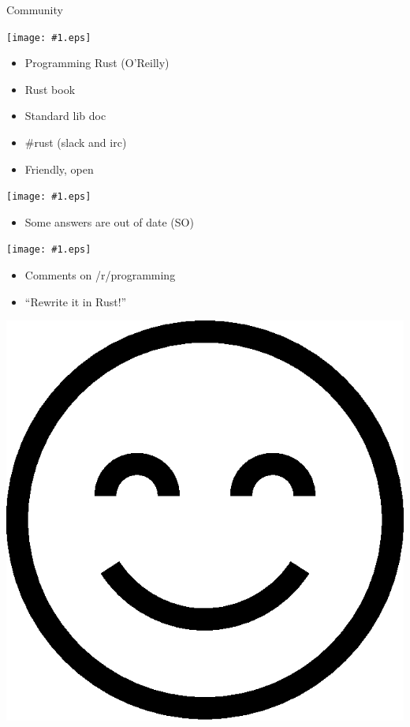 \documentclass{beamer}
\renewcommand\big[1]{
  \begin{center}
    \Huge{#1}
  \end{center}
}
\def\MinipageWidth{.32\textwidth}
\newcommand\SmileyBlock[2]{
  \begin{minipage}[t]{\MinipageWidth}
    \begin{center}
      \texttt{[image: \#1.eps]}
    \end{center}
    \scriptsize
    #2
  \end{minipage}
}
\begin{document}
\begin{frame}[t,fragile]
  \big{Community}\pause

  \SmileyBlock{good}{
    \begin{itemize}
      \item Programming Rust (O'Reilly)
      \item Rust book
      \item Standard lib doc
      \item \#rust (slack and irc)
      \item Friendly, open
    \end{itemize}
  }\pause
  \SmileyBlock{bad}{
    \begin{itemize}
      \item Some answers are out of date (SO)
    \end{itemize}
  }\pause
  \SmileyBlock{ugly}{
    \begin{itemize}
      \item Comments on /r/programming
      \item ``Rewrite it in Rust!''
    \end{itemize}
  }
\end{frame}

\begin{frame}
  \centering\includegraphics{good.eps}
\end{frame}
\end{document}
